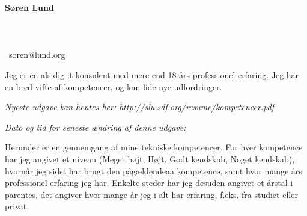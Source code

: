 \documentclass[a4paper,11pt]{article}
\newcommand\redacted{[skjult i online version]}
\newcommand\myaddressone{\redacted}
\newcommand\myaddresstwo{\redacted}
\newcommand\myphone{\redacted}
\begin{document}
\centerline{}
\centerline{}

\begin{minipage}[b]{0.30\textwidth}
  \selectfont%
  \textbf{Søren Lund} \\
  \myaddressone \\
  \myaddresstwo \\
  \myphone \\
  \Email\ soren@lund.org
\end{minipage}%
\hfill
\begin{minipage}[b]{0.30\textwidth}
  \selectfont%
  Jeg er en alsidig it-konsulent med
  mere end 18 års professionel
  erfaring. Jeg har en bred vifte af
  kompetencer, og
  kan lide nye udfordringer.
\end{minipage}

\bigskip
\centerline{\small\textit{Nyeste udgave kan hentes her: http://slu.sdf.org/resume/kompetencer.pdf}}
\centerline{\small\textit{Dato og tid for seneste ændring af denne udgave: }}

\bigskip
\bigskip

\newcommand\High{Meget højt}
\newcommand\high{Højt}
\newcommand\know{Godt kendskab}
\newcommand\some{Noget kendskab}

Herunder er en gennemgang af mine tekniske kompetencer. For hver
kompetence har jeg angivet et niveau (\High, \high, \know, \some),
hvornår jeg sidst har brugt den pågældendeaa kompetence, samt hvor
mange års professionel erfaring jeg har. Enkelte steder har jeg
desuden angivet et årstal i parentes, det angiver hvor mange år jeg i
alt har erfaring, f.eks. fra studiet eller privat.
\end{document}
